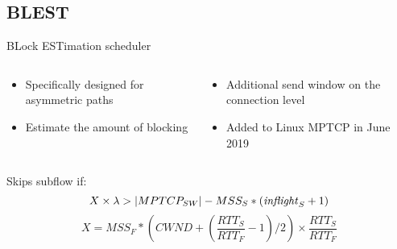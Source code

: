 \documentclass{beamer}
\begin{document}
\subsection{BLEST}
\begin{frame}{BLock ESTimation scheduler}
  \begin{columns}
    \begin{column}{0.48\textwidth}
      \begin{itemize}
        \setlength\itemsep{1.2em}
        \item Specifically designed for asymmetric paths
        \item Estimate the amount of blocking
      \end{itemize}
    \end{column}

    \begin{column}{0.48\textwidth}
      \begin{itemize}
        \setlength\itemsep{1.2em}
        \item Additional send window on the connection level
        \item Added to Linux MPTCP in June 2019
      \end{itemize}
    \end{column}
  \end{columns}


  \vspace{0.6cm}
  \begin{center}
    Skips subflow if:
    \begin{equation}
      X \times \lambda > |MPTCP_{SW}| - MSS_S * (\text{\textit{inflight}}_S + 1)
    \end{equation}\small
    \begin{equation}
      X=MSS_F * \left(CWND + \left(\frac{RTT_S}{RTT_F} -1 \right)/ 2 \right) \times \frac{RTT_S}{RTT_F}
    \end{equation}
  \end{center}
\end{frame}

\end{document}
